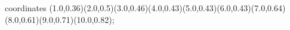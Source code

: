 					coordinates { (1.0,0.36)(2.0,0.5)(3.0,0.46)(4.0,0.43)(5.0,0.43)(6.0,0.43)(7.0,0.64)(8.0,0.61)(9.0,0.71)(10.0,0.82)};